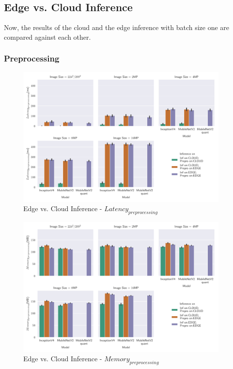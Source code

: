 \subsection{Edge vs. Cloud Inference}
Now, the results of the cloud and the edge inference with batch size one are compared against each other.
\subsubsection{Preprocessing}

\begin{figure}[H]
\centering
\includegraphics[width=0.95\textwidth]{./Bilder/single_plots/edge_vs_cloud_plots/Edge_vs_Cloud_Inference_Preprocessing_Latencies.pdf}
\caption{Edge vs. Cloud Inference -  $Latency_{preprocessing}$}
\label{fig:EdgeVsCloudPreproLat}
\end{figure}
\begin{figure}[H]
\centering
\includegraphics[width=0.95\textwidth]{./Bilder/single_plots/edge_vs_cloud_plots/Edge_vs_Cloud_Inference_Preprocessing_Memory.pdf}
\caption{Edge vs. Cloud Inference -  $Memory_{preprocessing}$}
\label{fig:EdgeVsCloudPreproMemory}
\end{figure}

